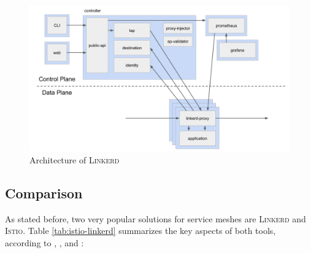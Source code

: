 \begin{figure}
    \includegraphics[width=\columnwidth]{img/linkerd_architecture.png}
    \caption{Architecture of \textsc{Linkerd} \cite{linkerd-docs-arch}}
    \label{fig:arch-linkerd}
\end{figure}

\subsection{Comparison}

As stated before, two very popular solutions for service meshes are \textsc{Linkerd} and \textsc{Istio}. Table \ref{tab:istio-linkerd} summarizes the key aspects of both tools, according to \cite{linkerd-github}, \cite{istio-github}, \cite{istio-linkerd-compare-1} and \cite{istio-linkerd-compare-2}:

